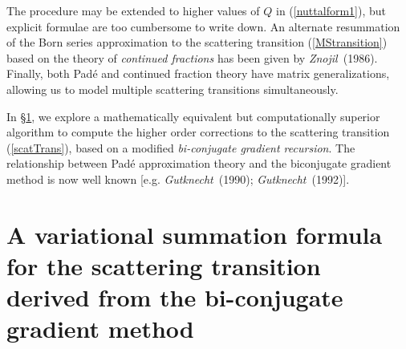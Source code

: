 The procedure may be extended to higher values of $Q$ in 
(\ref{nuttalform1}), but explicit 
formulae are too cumbersome to write down. An alternate resummation
of the Born series approximation to the scattering transition 
(\ref{MStransition})
 based on the theory of {\em continued fractions\/} has been given by 
{\em Znojil\/}~(1986). Finally, both Pad\'{e} and continued fraction theory
have matrix generalizations, allowing us to model multiple scattering 
transitions simultaneously.

 In \S\ref{sectionGBCG}, we 
explore a mathematically equivalent but computationally superior
algorithm to compute the higher order corrections to the scattering 
transition (\ref{scatTrans}), based on a modified {\em bi-conjugate 
gradient recursion\/}. The relationship between Pad\'{e} approximation 
theory
and the biconjugate gradient method is now well known [e.g. {\em 
Gutknecht\/}~(1990); {\em Gutknecht\/}~(1992)].




\section[A variational summation formula]
{A variational summation formula for the scattering transition
derived from the bi-conjugate gradient method} \label{sectionGBCG}

